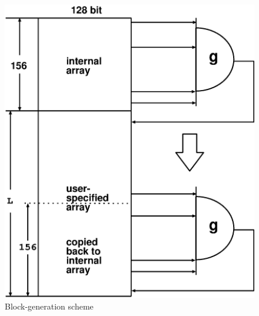 \documentclass[acmnow]{acmtrans2m}
\begin{document}
\begin{figure}
\begin{center}
\includegraphics[width=0.7\linewidth,height=0.7\textheight,
keepaspectratio]{fill_array.eps}
\end{center}
\caption{Block-generation scheme}
\label{fig:B1}
\end{figure}



\begin{received}
\end{received}
\end{document}
